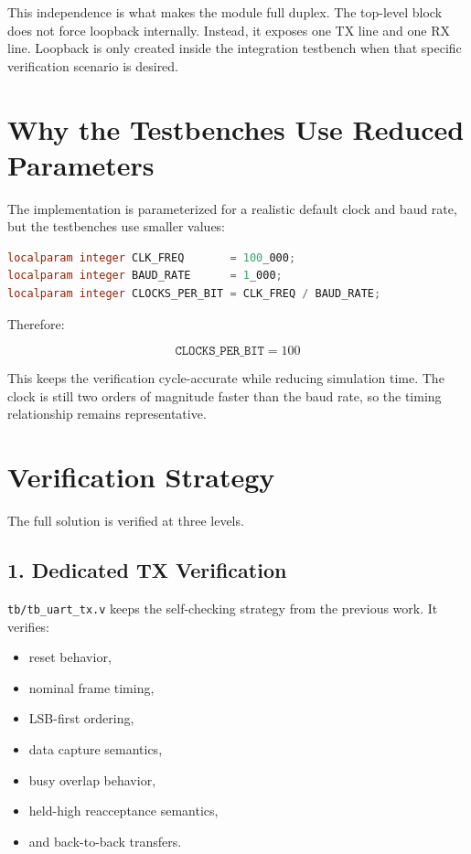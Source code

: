 \documentclass[12pt]{article}
\begin{document}
This independence is what makes the module full duplex. The top-level block does
not force loopback internally. Instead, it exposes one TX line and one RX line.
Loopback is only created inside the integration testbench when that specific
verification scenario is desired.

\section{Why the Testbenches Use Reduced Parameters}

The implementation is parameterized for a realistic default clock and baud rate,
but the testbenches use smaller values:

\begin{lstlisting}[language=Verilog]
localparam integer CLK_FREQ       = 100_000;
localparam integer BAUD_RATE      = 1_000;
localparam integer CLOCKS_PER_BIT = CLK_FREQ / BAUD_RATE;
\end{lstlisting}

Therefore:

\[
\texttt{CLOCKS\_PER\_BIT} = 100
\]

This keeps the verification cycle-accurate while reducing simulation time. The
clock is still two orders of magnitude faster than the baud rate, so the timing
relationship remains representative.

\section{Verification Strategy}

The full solution is verified at three levels.

\subsection*{1. Dedicated TX Verification}

\texttt{tb/tb\_uart\_tx.v} keeps the self-checking strategy from the previous
work. It verifies:

\begin{itemize}
    \item reset behavior,
    \item nominal frame timing,
    \item LSB-first ordering,
    \item data capture semantics,
    \item busy overlap behavior,
    \item held-high reacceptance semantics,
    \item and back-to-back transfers.
\end{itemize}
\end{document}
